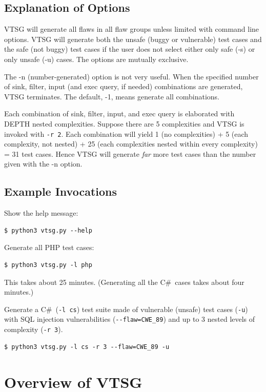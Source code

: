 \documentclass[12pt]{article}
\newcommand{\CSharp}{C{\fontseries{b}\selectfont\#}}
\begin{document}
\subsection{Explanation of Options}

VTSG will generate all flaws in all flaw groups unless limited with
command line options.
VTSG will generate both the unsafe (buggy or vulnerable)
test cases and the safe (not buggy) test cases if the user does not select
either only safe (-s) or only unsafe (-u) cases.  The options are
mutually exclusive.

The -n (number-generated) option is not very useful.  When the
specified number of sink, filter, input (and exec query, if needed)
combinations are generated, VTSG terminates.  The default, -1,
means generate all combinations.

Each combination of sink, filter, input, and exec query is elaborated
with DEPTH nested complexities.  Suppose there are 5 complexities
and VTSG is invoked with \verb|-r 2|.  Each combination will yield
1 (no complexities) + 5 (each complexity, not nested) + 
25 (each complexities nested within every complexity) = 31 test cases.  
Hence VTSG will generate \emph{far} more test cases than the number
given with the -n option.

\subsection{Example Invocations}

Show the help message:
\begin{verbatim}
$ python3 vtsg.py --help
\end{verbatim}

Generate all PHP test cases:
\begin{verbatim}
$ python3 vtsg.py -l php
\end{verbatim}

This takes about 25 minutes.  (Generating all the \CSharp\ cases takes about four
minutes.)

Generate a \CSharp\ (\verb|-l cs|) test suite made of vulnerable (unsafe) test
cases (\verb|-u|) with SQL injection vulnerabilities (\verb|--flaw=CWE_89|)
and up to 3 nested levels of complexity (\verb|-r 3|).
\begin{verbatim}
$ python3 vtsg.py -l cs -r 3 --flaw=CWE_89 -u
\end{verbatim}
 
\section{Overview of VTSG}
\end{document}
